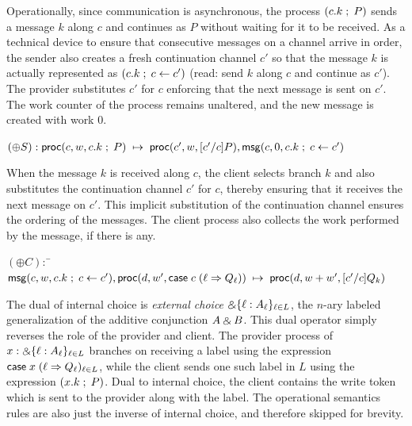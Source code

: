 Operationally, since communication is asynchronous, the process
$(c.k \; ; \; P)$ sends a message $k$
along $c$ and continues as $P$ without waiting for it to be received.
As a technical device to ensure that consecutive messages on a
channel arrive in order, the sender also creates a fresh continuation
channel $c'$ so that the message $k$ is actually represented as
$(c.k \; ; \; c \leftarrow c')$ (read: send $k$ along $c$ and
continue as $c'$). The provider substitutes $c'$ for $c$ enforcing
that the next message is sent on $c'$.
The work counter of the process remains unaltered, and the new message
is created with work $0$.
\begin{tabbing}
$(\oplus S) : \mathsf{proc}(c, w, c.k \; ; \; P) \; \mapsto \; \mathsf{proc}(c', w, [c'/c]P),
\mathsf{msg}(c, 0, c.k \; ; \; c \leftarrow c')$
\end{tabbing}
When the message $k$ is received along $c$, the client selects branch
$k$ and also substitutes the continuation channel $c'$ for $c$, thereby
ensuring that it receives the next message on $c'$. This implicit
substitution of the continuation channel ensures the ordering of the
messages.
The client process also collects the work performed by the message, if
there is any.
\begin{tabbing}
$(\oplus C) :$ \= $\mathsf{msg}(c, w, c.k \; ; \; c \leftarrow c'),
\mathsf{proc}(d, w', \mathsf{case} \; c \; (\ell \Rightarrow Q_\ell))
\; \mapsto \; \mathsf{proc}(d, w+w',[c'/c]Q_k)$
\end{tabbing}

The dual of internal choice is \emph{external choice} $\mathbin{\binampersand} \{ \ell :
A_\ell \}_{\ell \in L}$, the $n$-ary labeled generalization of the
additive conjunction $A \mathbin{\binampersand} B$. This dual operator simply reverses
the role of the provider and client. The provider process of
$x : \mathbin{\binampersand} \{ \ell : A_\ell \}_{\ell \in L}$ branches on receiving a label
using the expression $\mathsf{case} \; x \; (\ell \Rightarrow Q_\ell)_{\ell \in L}$,
while the client sends one such label in $L$ using the expression $(x.k \; ; \; P)$.
Dual to internal choice, the client contains the write token which is
sent to the provider along with the label.
The operational semantics rules are also just the inverse of internal choice,
and therefore skipped for brevity.


